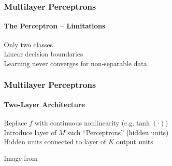 \documentclass[xetex,professionalfont]{beamer}
\newcommand{\eg}{\mbox{e.g.}\xspace} %
\begin{document}

\begin{frame}
\frametitle{Multilayer Perceptrons}
\framesubtitle{The Perceptron -- Limitations}

Only two classes\\\medskip %
Linear decision boundaries\\\medskip %
Learning never converges for non-separable data %

\end{frame}


\begin{frame}
\frametitle{Multilayer Perceptrons}
\framesubtitle{Two-Layer Architecture}


Replace $f$ with continuous nonlinearity (\eg $\tanh(\cdot)$)\\\medskip %
Introduce layer of $M$ such \enquote{Perceptrons} (hidden units)\\\medskip %
Hidden units connected to layer of $K$ output units

\begin{center}
	{\centering Image from \cite{bishop2006}}
\end{center}

\end{frame}
\end{document}
